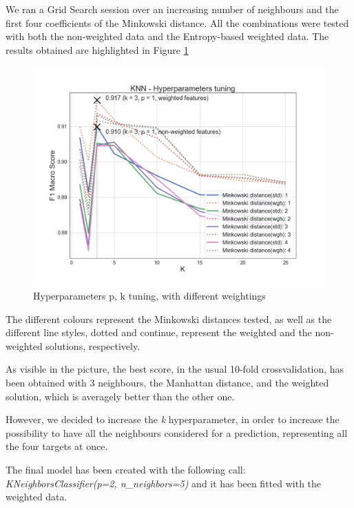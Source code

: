 We ran a Grid Search session over an increasing number of neighbours and the first four coefficients of the Minkowski distance.
All the combinations were tested with both the non-weighted data and the Entropy-based weighted data.
The results obtained are highlighted in Figure \ref{fig:knn_tuning}

\begin{figure}
	\includegraphics[width=\columnwidth]{chapter5/figure/knn_tuning.png}
	\caption{Hyperparameters p, k tuning, with different weightings}
	\label{fig:knn_tuning}
\end{figure}
The different colours represent the Minkowski distances tested, as well as the different line styles, dotted and continue, represent the weighted and the non-weighted solutions, respectively.

As visible in the picture, the best score, in the usual 10-fold crossvalidation, has been obtained with  3 neighbours, the Manhattan distance, and the weighted solution, which is averagely better than the other one.

However, we decided to increase the \textit{k} hyperparameter, in order to increase the possibility to have all the neighbours considered for a prediction, representing all the four targets at once. 

The final model has been created with the following call: \textit{KNeighborsClassifier(p=2, n\_neighbors=5)} and it has been fitted with the weighted data.

